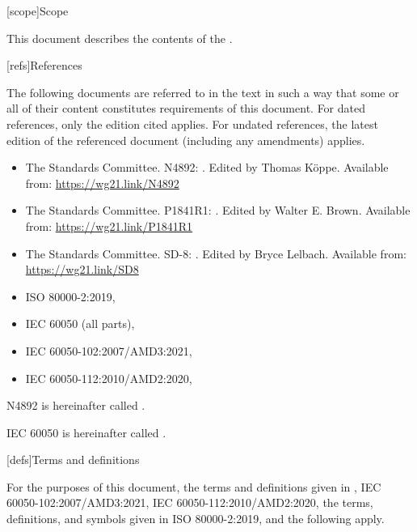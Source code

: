 

[scope]{Scope}

\pnum
{}%
This document describes the contents of the .


[refs]{References}

\pnum
{}%
The following documents are referred to in the text
in such a way that some or all of their content
constitutes requirements of this document.
For dated references, only the edition cited applies.
For undated references,
the latest edition of the referenced document
(including any amendments) applies.
\begin{itemize}
\item
The \Cpp{} Standards Committee.
N4892: .
Edited by Thomas K\"{o}ppe.
Available from: \url{https://wg21.link/N4892}
\item
The \Cpp{} Standards Committee.
P1841R1: .
Edited by Walter E. Brown.
Available from: \url{https://wg21.link/P1841R1}
\item
The \Cpp{} Standards Committee.
SD-8: .
Edited by Bryce Lelbach.
Available from: \url{https://wg21.link/SD8}
\item
ISO 80000-2:2019, 
\item
IEC 60050 (all parts),
\item
IEC 60050-102:2007/AMD3:2021,
\item
IEC 60050-112:2010/AMD2:2020,
\end{itemize}

\pnum
N4892 is hereinafter called .

\pnum
IEC 60050 is hereinafter called .


[defs]{Terms and definitions}

\pnum
{}%
For the purposes of this document,
the terms and definitions given in
\Cpp{},
IEC 60050-102:2007/AMD3:2021,
IEC 60050-112:2010/AMD2:2020,
the terms, definitions, and symbols given in
ISO 80000-2:2019,
and the following apply.

